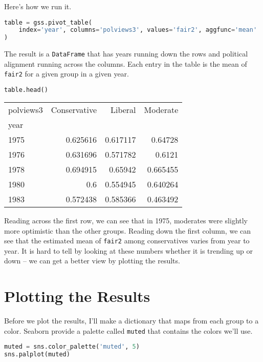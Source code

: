Here's how we run it.

\begin{lstlisting}[language=Python,style=source]
table = gss.pivot_table(
    index='year', columns='polviews3', values='fair2', aggfunc='mean'
)
\end{lstlisting}

The result is a \passthrough{\lstinline!DataFrame!} that has years
running down the rows and political alignment running across the
columns. Each entry in the table is the mean of
\passthrough{\lstinline!fair2!} for a given group in a given year.

\begin{lstlisting}[language=Python,style=source]
table.head()
\end{lstlisting}

\begin{tabular}{lrrr}
\midrule
polviews3 & Conservative & Liberal & Moderate \\
year &  &  &  \\
\midrule
1975 & 0.625616 & 0.617117 & 0.64728 \\
1976 & 0.631696 & 0.571782 & 0.6121 \\
1978 & 0.694915 & 0.65942 & 0.665455 \\
1980 & 0.6 & 0.554945 & 0.640264 \\
1983 & 0.572438 & 0.585366 & 0.463492 \\
\midrule
\end{tabular}

Reading across the first row, we can see that in 1975, moderates were
slightly more optimistic than the other groups. Reading down the first
column, we can see that the estimated mean of
\passthrough{\lstinline!fair2!} among conservatives varies from year to
year. It is hard to tell by looking at these numbers whether it is
trending up or down -- we can get a better view by plotting the results.

\section{Plotting the Results}\label{plotting-the-results}

Before we plot the results, I'll make a dictionary that maps from each
group to a color. Seaborn provide a palette called
\passthrough{\lstinline!muted!} that contains the colors we'll use.

\begin{lstlisting}[language=Python,style=source]
muted = sns.color_palette('muted', 5)
sns.palplot(muted)
\end{lstlisting}

